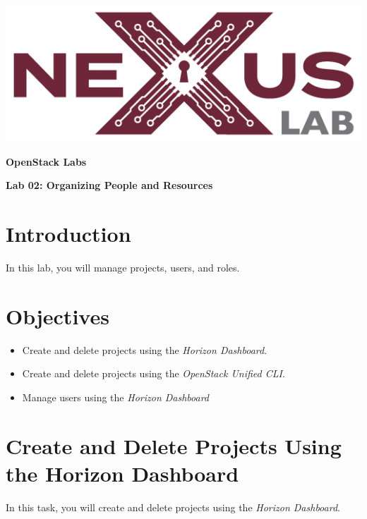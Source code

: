\documentclass[letterpaper, 12pt]{article}
\begin{document}
\begin{titlepage}
    \centering
    \includegraphics[scale=0.5]{images/nexus_lab_logo.png}

    \vspace*{\baselineskip}

    \textbf{\Large OpenStack Labs}

    \vspace*{\baselineskip}

    \textbf{\Large Lab 02: Organizing People and Resources}
    \vspace*{\fill}
\end{titlepage}

\pagestyle{fancy}
\tableofcontents
\clearpage

\section*{Introduction}
\label{sec:introduction}
In this lab, you will manage projects, users, and roles.

\section*{Objectives}
\label{sec:objectives}
\begin{itemize}[itemsep=0pt]
    \item Create and delete projects using the \textit{Horizon Dashboard}.
    \item Create and delete projects using the \textit{OpenStack Unified CLI}.
    \item Manage users using the \textit{Horizon Dashboard}
\end{itemize}
\clearpage

\section{Create and Delete Projects Using the Horizon Dashboard}
\label{sec:create_and_delete_projects_using_the_horizon_dashboard}
In this task, you will create and delete projects using the \textit{Horizon Dashboard}.
\end{document}
